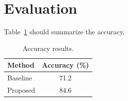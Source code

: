 \documentclass{article}
\begin{document}
\section{Evaluation}
Table~\ref{tab:accuracy} should summarize the accuracy.
\begin{table}[h]
\centering
\caption{Accuracy results.}
\label{tab:accuracy}
\begin{tabular}{lc}
\hline
Method & Accuracy (\%) \\
\hline
Baseline & 71.2 \\
Proposed & 84.6 \\
\hline
\end{tabular}
\end{table}
\end{document}
